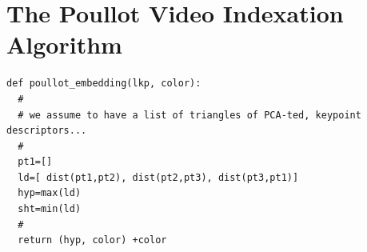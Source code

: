 \documentclass{report}
\begin{document}
\section{The Poullot Video Indexation Algorithm}
\begin{lstlisting}
def poullot_embedding(lkp, color):
  #
  # we assume to have a list of triangles of PCA-ted, keypoint descriptors...
  #
  pt1=[]
  ld=[ dist(pt1,pt2), dist(pt2,pt3), dist(pt3,pt1)]
  hyp=max(ld)
  sht=min(ld)
  # 
  return (hyp, color) +color

\end{lstlisting}
\end{document}
